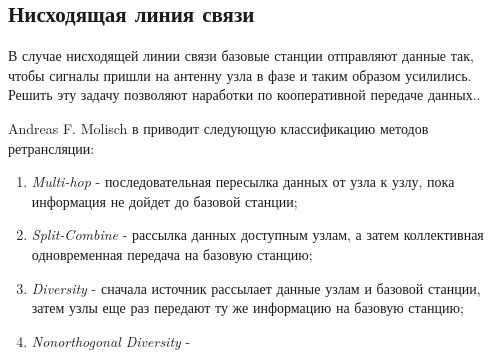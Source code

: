 \documentclass[a4paper,12pt,oneside]{scrartcl}
\begin{document}
\subsection{Нисходящая линия связи}

В случае нисходящей линии связи базовые станции отправляют данные так, чтобы сигналы пришли на антенну узла в фазе и таким образом усилились. Решить эту задачу позволяют наработки по кооперативной передаче данных..


Andreas F. Molisch в \cite{B1} приводит следующую классификацию методов ретрансляции:
\begin{enumerate}
\item \textit{Multi-hop} - последовательная пересылка данных от узла к узлу, пока информация не дойдет до базовой станции;
\item \textit{Split-Combine} - рассылка данных доступным узлам, а затем коллективная одновременная передача на базовую станцию;
\item \textit{Diversity} - сначала источник рассылает данные узлам и базовой станции, затем узлы еще раз передают ту же информацию на базовую станцию;
\item \textit{Nonorthogonal Diversity} -  
\end{enumerate}
\clearpage
\end{document}
